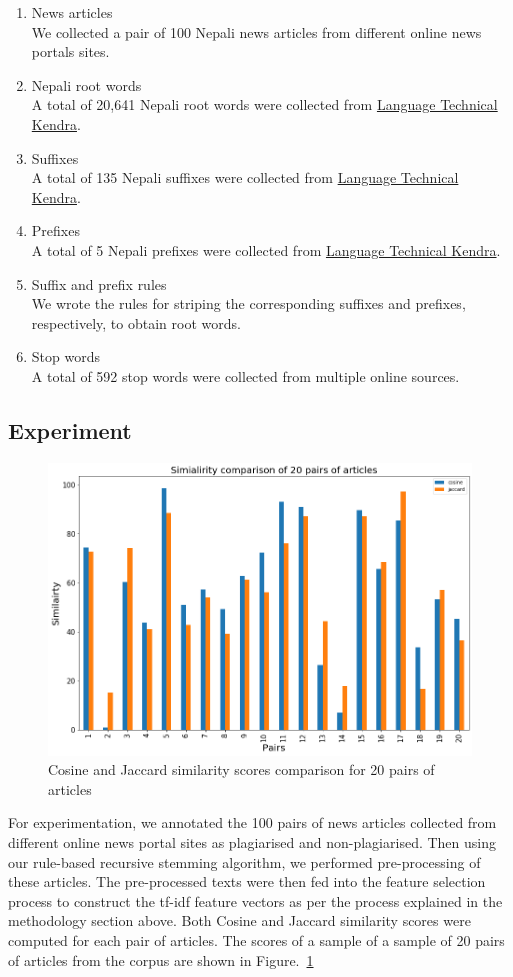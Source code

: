 \documentclass[conference]{IEEEtran}
\begin{document}
\begin{enumerate}
\item News articles\\
We collected a pair of 100 Nepali news articles from different online news portals sites.
\medskip

\item Nepali root words\\
A total of 20,641 Nepali root words were collected from \href{http://ltk.org.np}{Language Technical Kendra}.
\medskip

\item Suffixes\\
A total of 135 Nepali suffixes were collected from \href{http://ltk.org.np}{Language Technical Kendra}.
\medskip

\item Prefixes\\
A total of 5 Nepali prefixes were collected from \href{http://ltk.org.np}{Language Technical Kendra}.
\medskip

\item Suffix and prefix rules\\
We wrote the rules for striping the corresponding suffixes and prefixes, respectively, to obtain root words.
\medskip

\item Stop words\\
A total of 592 stop words were collected from multiple online sources.

\end{enumerate}

\subsection{Experiment}

\begin{figure}[h!]
  \centerline{\includegraphics[width=0.4 \textwidth]{figures/similarity.png}}
\caption{Cosine and Jaccard similarity scores comparison for 20 pairs of articles}
\label{similarity}
\end{figure}

For experimentation, we annotated the 100 pairs of news articles
collected from different online news portal sites as plagiarised and
non-plagiarised. Then using our rule-based recursive stemming algorithm, we
performed pre-processing of these articles. The pre-processed texts were then fed
into the feature selection process to construct the tf-idf feature vectors as
per the process explained in the methodology section above. Both Cosine and
Jaccard similarity scores were computed for each pair of articles. The
scores of a sample of a sample of 20 pairs of articles from the corpus 
are shown in Figure.~\ref{similarity}
\end{document}
